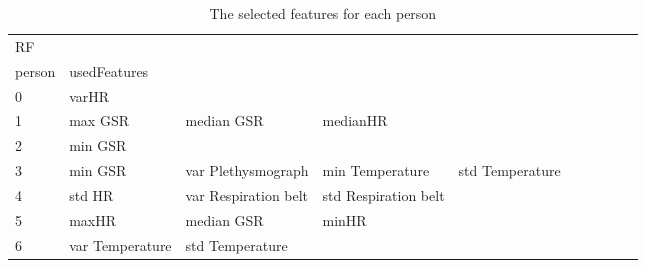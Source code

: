 \begin{landscape}
\begin{table}[]
\centering
\caption{The selected features for each person}
\begin{tabular}{l|llllllll}
RF       &                         &                       &                         &                         &                         &                       &                      &          &                      &        \\
person   & usedFeatures            &                       &                         &                         &                         &                       &                      &          &                      &        \\
0        & varHR                   &                       &                         &                         &                         &                       &                      &          &                      &        \\
1        & max GSR                 & median GSR            & medianHR                &                         &                         &                       &                      &          &                      &        \\
2        & min GSR                 &                       &                         &                         &                         &                       &                      &          &                      &        \\
3        & min GSR                 & var Plethysmograph    & min Temperature         & std Temperature         &                         &                       &                      &          &                      &        \\
4        & std HR                  & var Respiration belt  & std Respiration belt    &                         &                         &                       &                      &          &                      &        \\
5        & maxHR                   & median GSR            & minHR                   &                         &                         &                       &                      &          &                      &        \\
6        & var Temperature         & std Temperature       &                         &                         &                         &                       &                      &          &                      &        \\

\end{tabular}
\end{table}
\end{landscape}
